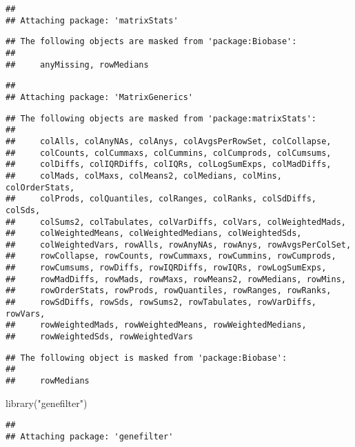 \documentclass[
]{article}
\newenvironment{Shaded}{\begin{snugshade}}{\end{snugshade}}
\newcommand{\FunctionTok}[1]{\textcolor[rgb]{0.00,0.00,0.00}{#1}}
\newcommand{\NormalTok}[1]{#1}
\newcommand{\StringTok}[1]{\textcolor[rgb]{0.31,0.60,0.02}{#1}}
\begin{document}
\begin{verbatim}
## 
## Attaching package: 'matrixStats'
\end{verbatim}

\begin{verbatim}
## The following objects are masked from 'package:Biobase':
## 
##     anyMissing, rowMedians
\end{verbatim}

\begin{verbatim}
## 
## Attaching package: 'MatrixGenerics'
\end{verbatim}

\begin{verbatim}
## The following objects are masked from 'package:matrixStats':
## 
##     colAlls, colAnyNAs, colAnys, colAvgsPerRowSet, colCollapse,
##     colCounts, colCummaxs, colCummins, colCumprods, colCumsums,
##     colDiffs, colIQRDiffs, colIQRs, colLogSumExps, colMadDiffs,
##     colMads, colMaxs, colMeans2, colMedians, colMins, colOrderStats,
##     colProds, colQuantiles, colRanges, colRanks, colSdDiffs, colSds,
##     colSums2, colTabulates, colVarDiffs, colVars, colWeightedMads,
##     colWeightedMeans, colWeightedMedians, colWeightedSds,
##     colWeightedVars, rowAlls, rowAnyNAs, rowAnys, rowAvgsPerColSet,
##     rowCollapse, rowCounts, rowCummaxs, rowCummins, rowCumprods,
##     rowCumsums, rowDiffs, rowIQRDiffs, rowIQRs, rowLogSumExps,
##     rowMadDiffs, rowMads, rowMaxs, rowMeans2, rowMedians, rowMins,
##     rowOrderStats, rowProds, rowQuantiles, rowRanges, rowRanks,
##     rowSdDiffs, rowSds, rowSums2, rowTabulates, rowVarDiffs, rowVars,
##     rowWeightedMads, rowWeightedMeans, rowWeightedMedians,
##     rowWeightedSds, rowWeightedVars
\end{verbatim}

\begin{verbatim}
## The following object is masked from 'package:Biobase':
## 
##     rowMedians
\end{verbatim}

\begin{Shaded}
\begin{Highlighting}[]
\FunctionTok{library}\NormalTok{(}\StringTok{"genefilter"}\NormalTok{)}
\end{Highlighting}
\end{Shaded}

\begin{verbatim}
## 
## Attaching package: 'genefilter'
\end{verbatim}
\end{document}
